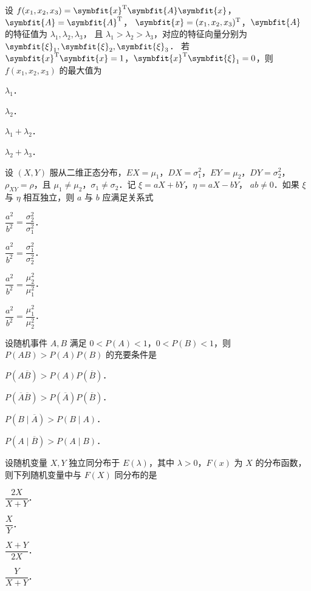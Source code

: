 \begin{question}[index=7]
设 $f(x_1,x_2,x_3)=\symbfit{x}^{\mathrm T}\symbfit{A}\symbfit{x}$，$\symbfit{A}=\symbfit{A}^{\mathrm T}$，
$\symbfit{x}=(x_1,x_2,x_3)^{\mathrm T}$，$\symbfit{A}$ 的特征值为 $\lambda_1,\lambda_2,\lambda_3$，
且 $\lambda_1>\lambda_2>\lambda_3$，对应的特征向量分别为 $\symbfit{\xi}_1,\symbfit{\xi}_2,\symbfit{\xi}_3$．
若 $\symbfit{x}^{\mathrm T}\symbfit{x}=1$，$\symbfit{x}^{\mathrm T}\symbfit{\xi}_1=0$，则 $f(x_1,x_2,x_3)$ 的最大值为
\begin{choices}[columns=4]
\item $\lambda_1$．
\item $\lambda_2$．
\item $\lambda_1+\lambda_2$．
\item $\lambda_2+\lambda_3$．
\end{choices}
\end{question}
\QuestionBreak

\begin{question}[index=8]
设 $(X,Y)$ 服从二维正态分布，$EX=\mu_1$，$DX=\sigma_1^2$，$EY=\mu_2$，$DY=\sigma_2^2$，
$\rho_{XY}=\rho$，且 $\mu_1\ne\mu_2$，$\sigma_1\ne\sigma_2$．记 $\xi=aX+bY$，$\eta=aX-bY$，
$ab\ne0$．如果 $\xi$ 与 $\eta$ 相互独立，则 $a$ 与 $b$ 应满足关系式
\begin{choices}[columns=2,label-pos=left]
\item $\dfrac{a^2}{b^2}=\dfrac{\sigma_2^2}{\sigma_1^2}$．
\item $\dfrac{a^2}{b^2}=\dfrac{\sigma_1^2}{\sigma_2^2}$．
\item $\dfrac{a^2}{b^2}=\dfrac{\mu_2^2}{\mu_1^2}$．
\item $\dfrac{a^2}{b^2}=\dfrac{\mu_1^2}{\mu_2^2}$．
\end{choices}
\end{question}
\QuestionBreak

\begin{question}[index=9]
设随机事件 $A,B$ 满足 $0<P(A)<1$，$0<P(B)<1$，则 $P(AB)>P(A)P(B)$ 的充要条件是
\begin{choices}[columns=2]
\item $P(A\overline B)>P(A)P(\overline B)$．
\item $P(\overline A\overline B)>P(\overline A)P(\overline B)$．
\item $P(B\mid\overline A)>P(B\mid A)$．
\item $P(A\mid\overline B)>P(A\mid B)$．
\end{choices}
\end{question}
\QuestionBreak

\begin{question}[index=10]
设随机变量 $X,Y$ 独立同分布于 $E(\lambda)$，其中 $\lambda>0$，$F(x)$ 为 $X$ 的分布函数，
则下列随机变量中与 $F(X)$ 同分布的是
\begin{choices}[columns=4,label-pos=left]
\item $\dfrac{2X}{X+Y}$．
\item $\dfrac{X}{Y}$．
\item $\dfrac{X+Y}{2X}$．
\item $\dfrac{Y}{X+Y}$．
\end{choices}
\end{question}
